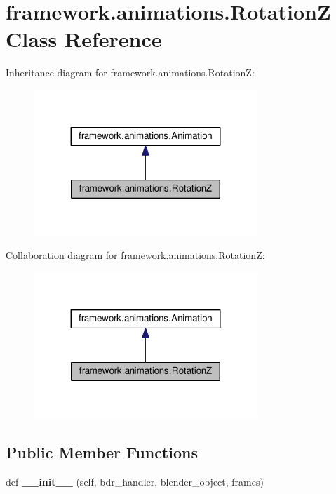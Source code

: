 \hypertarget{classframework_1_1animations_1_1RotationZ}{}\section{framework.\+animations.\+RotationZ Class Reference}
\label{classframework_1_1animations_1_1RotationZ}


Inheritance diagram for framework.\+animations.\+RotationZ\+:
\nopagebreak
\begin{figure}[H]
\begin{center}
\leavevmode
\includegraphics[width=239pt]{classframework_1_1animations_1_1RotationZ__inherit__graph}
\end{center}
\end{figure}


Collaboration diagram for framework.\+animations.\+RotationZ\+:
\nopagebreak
\begin{figure}[H]
\begin{center}
\leavevmode
\includegraphics[width=239pt]{classframework_1_1animations_1_1RotationZ__coll__graph}
\end{center}
\end{figure}
\subsection*{Public Member Functions}
\begin{DoxyCompactItemize}
\item 
def {\bfseries \+\_\+\+\_\+init\+\_\+\+\_\+} (self, bdr\+\_\+handler, blender\+\_\+object, frames)\hypertarget{classframework_1_1animations_1_1RotationZ_ae7dd9ed1b41c74b9b5d26e29e9cc6600}{}\label{classframework_1_1animations_1_1RotationZ_ae7dd9ed1b41c74b9b5d26e29e9cc6600}

\end{DoxyCompactItemize}
